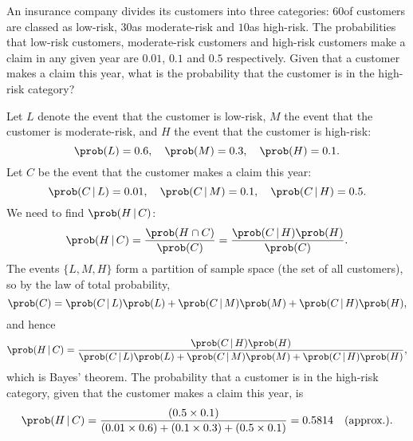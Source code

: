 \begin{homework}
\begin{questions}

\question
An insurance company divides its customers into three categories: $60$\percent of customers are classed as low-risk, $30$\percent as moderate-risk and $10$\percent as high-risk. The probabilities that low-risk customers, moderate-risk customers and high-risk customers make a claim in any given year are $0.01$, $0.1$ and $0.5$ respectively. Given that a customer makes a claim this year, what is the probability that the customer is in the high-risk category?

\begin{answer}
Let $L$ denote the event that the customer is low-risk, $M$ the event that the customer is moderate-risk, and $H$ the event that the customer is high-risk:
\[
\prob(L) = 0.6,\quad \prob(M) = 0.3,\quad \prob(H) = 0.1.
\]
Let $C$ be the event that the customer makes a claim this year:
\[
\prob(C\,|\,L) = 0.01,\quad \prob(C\,|\,M) = 0.1,\quad \prob(C\,|\,H) = 0.5.
\]
We need to find $\prob(H\,|\,C)$:
\[
\prob(H\,|\,C) = \frac{\prob(H\cap C)}{\prob(C)} = \frac{\prob(C\,|\,H)\prob(H)}{\prob(C)}.
\]
The events $\{L,M,H\}$ form a partition of sample space (the set of all customers), so by the law of total probability,
\[
\prob(C) = \prob(C\,|\,L)\prob(L) + \prob(C\,|\,M)\prob(M) + \prob(C\,|\,H)\prob(H),
\]
and hence
\[
\prob(H\,|\,C) = \frac{\prob(C\,|\,H)\prob(H)}{\prob(C\,|\,L)\prob(L) + \prob(C\,|\,M)\prob(M) + \prob(C\,|\,H)\prob(H)},
\]
which is Bayes' theorem. The probability that a customer is in the high-risk category, given that the customer makes a claim this year, is 
\[
\prob(H\,|\,C) 
	= \frac{(0.5\times 0.1)}{(0.01\times 0.6) + (0.1\times 0.3) + (0.5\times 0.1)}
	= 0.5814\quad\text{(approx.).}
\]
\end{answer}


\end{questions}
\end{homework}

\endinput
